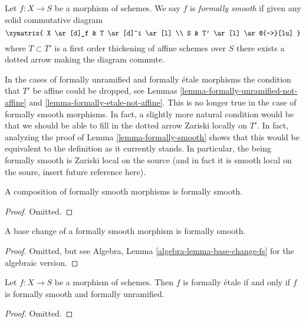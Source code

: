 \begin{definition}
\label{definition-formally-smooth}
Let $f : X \to S$ be a morphism of schemes.
We say $f$ is {\it formally smooth} if given any solid commutative diagram
$$
\xymatrix{
X \ar[d]_f & T \ar[d]^i \ar[l] \\
S & T' \ar[l] \ar@{-->}[lu]
}
$$
where $T \subset T'$ is a first order thickening of affine schemes over $S$
there exists a dotted arrow making the diagram commute.
\end{definition}

\noindent
In the cases of formally unramified and formally \'etale morphisms
the condition that $T'$ be affine could be dropped, see
Lemmas \ref{lemma-formally-unramified-not-affine} and
\ref{lemma-formally-etale-not-affine}.
This is no longer true in the case of formally smooth morphisms.
In fact, a slightly more natural condition would be that we should be
able to fill in the dotted arrow Zariski locally on $T'$.
In fact, analyzing the proof of
Lemma \ref{lemma-formally-smooth}
shows that this would be equivalent to the definition as it currently
stands. In particular, the being formally smooth is
Zariski local on the source (and in fact it is smooth local on the soure,
insert future reference here).

\begin{lemma}
\label{lemma-composition-formally-smooth}
A composition of formally smooth morphisms is formally smooth.
\end{lemma}

\begin{proof}
Omitted.
\end{proof}

\begin{lemma}
\label{lemma-base-change-formally-smooth}
A base change of a formally smooth morphism is formally smooth.
\end{lemma}

\begin{proof}
Omitted, but see Algebra, Lemma \ref{algebra-lemma-base-change-fs}
for the algebraic version.
\end{proof}

\begin{lemma}
\label{lemma-formally-etale-unramified-smooth}
Let $f : X \to S$ be a morphism of schemes.
Then $f$ is formally \'etale if and only if
$f$ is formally smooth and formally unramified.
\end{lemma}

\begin{proof}
Omitted.
\end{proof}

